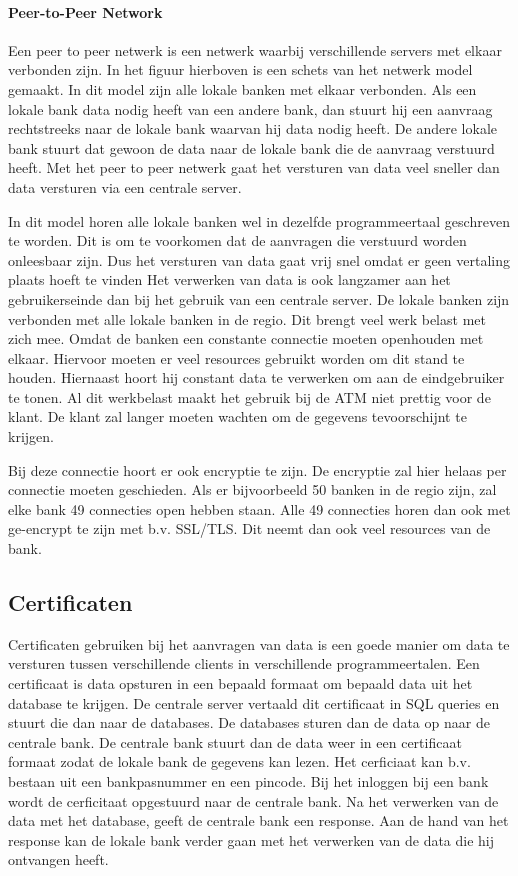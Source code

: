 \documentclass{article}
\begin{document}
\paragraph{Peer-to-Peer Network}
Een peer to peer netwerk is een netwerk waarbij verschillende servers met
elkaar verbonden zijn.
In het figuur hierboven is een schets van het netwerk model gemaakt.
In dit model zijn alle lokale banken met elkaar verbonden.
Als een lokale bank data nodig heeft van een andere bank,
dan stuurt hij een aanvraag rechtstreeks naar de lokale bank
waarvan hij data nodig heeft.
De andere lokale bank stuurt dat gewoon de data naar de lokale bank
die de aanvraag verstuurd heeft.
Met het peer to peer netwerk gaat het versturen van data veel sneller
dan data versturen via een centrale server.

In dit model horen alle lokale banken wel in dezelfde programmeertaal geschreven te worden.
Dit is om te voorkomen dat de aanvragen die verstuurd worden onleesbaar zijn.
Dus het versturen van data gaat vrij snel omdat er geen vertaling plaats hoeft te vinden
Het verwerken van data is ook langzamer aan het gebruikerseinde dan bij
het gebruik van een centrale server.
De lokale banken zijn verbonden met alle lokale banken in de regio.
Dit brengt veel werk belast met zich mee.
Omdat de banken een constante connectie moeten openhouden met elkaar.
Hiervoor moeten er veel resources gebruikt worden om dit stand te houden.
Hiernaast hoort hij constant data te verwerken om aan de eindgebruiker te tonen.
Al dit werkbelast maakt het gebruik bij de ATM niet prettig voor de klant.
De klant zal langer moeten wachten om de gegevens tevoorschijnt te krijgen.

Bij deze connectie hoort er ook encryptie te zijn.
De encryptie zal hier helaas per connectie moeten geschieden.
Als er bijvoorbeeld 50 banken in de regio zijn,
zal elke bank 49 connecties open hebben staan.
Alle 49 connecties horen dan ook met ge-encrypt te zijn met b.v. SSL/TLS.
Dit neemt dan ook veel resources van de bank.

\subsection{Certificaten}
Certificaten gebruiken bij het aanvragen van data is een goede manier
om data te versturen tussen verschillende clients in verschillende programmeertalen.
Een certificaat is data opsturen in een bepaald formaat om bepaald data uit het
database te krijgen.
De centrale server vertaald dit certificaat in SQL queries en stuurt die dan naar
de databases.
De databases sturen dan de data op naar de centrale bank.
De centrale bank stuurt dan de data weer in een certificaat formaat
zodat de lokale bank de gegevens kan lezen.
Het cerficiaat kan b.v. bestaan uit een bankpasnummer en een pincode.
Bij het inloggen bij een bank wordt de cerficitaat opgestuurd naar de centrale bank.
Na het verwerken van de data met het database,
geeft de centrale bank een response.
Aan de hand van het response kan de lokale bank verder gaan met het
verwerken van de data die hij ontvangen heeft.
\end{document}
